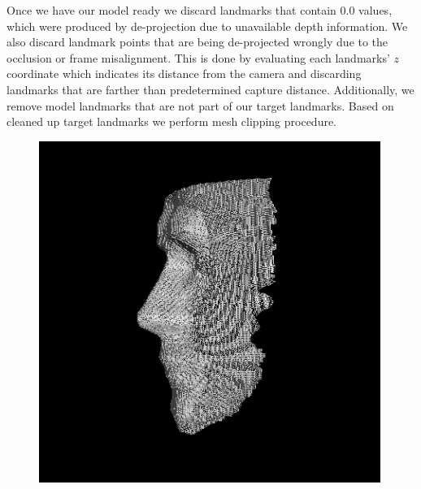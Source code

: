 Once we have our model ready we discard landmarks that contain 0.0 values, which were produced by de-projection due to unavailable depth information. We also discard landmark points that are being de-projected wrongly due to the occlusion or frame misalignment. This is done by evaluating each landmarks' $z$ coordinate which indicates its distance from the camera and discarding landmarks that are farther than predetermined capture distance. Additionally, we remove model landmarks that are not part of our target landmarks.  Based on cleaned up target landmarks we perform mesh clipping procedure. 

\begin{figure}
  \centering  
  \begin{minipage}{.32\textwidth}
    \centering
    \includegraphics[width=0.99\textwidth]{Figures/Pictures/mesh_r.png}
  \end{minipage}
  \begin{minipage}{.32\textwidth}
    \centering

\end{minipage}
\end{figure}
